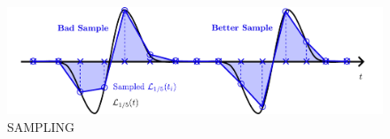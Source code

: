 


\begin{figure}[t]
\centering
\includegraphics[scale=0.65]{assets/imgs/wave-sampling-comparison.pdf}
\caption{SAMPLING}
\label{fig:wave-sampling}
\end{figure}







